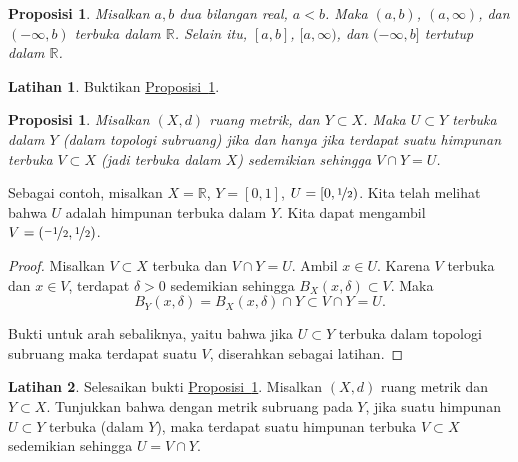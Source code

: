 \documentclass[12pt,openany]{book}
\newcommand{\R}{{\mathbb{R}}}
\theoremstyle{plain}
\newtheorem{prop}[thm]{Proposisi}
\theoremstyle{remark}
\theoremstyle{definition}
\newenvironment{exbox}{%
    \def\FrameCommand{\vrule width 1pt \relax\hspace{10pt}}%
    \MakeFramed{\advance\hsize-\width\FrameRestore}%
}{%
    \endMakeFramed
}
\theoremstyle{exercise}
\newtheorem{exercise}{Latihan}[section]
\theoremstyle{example}
\newcommand{\propref}[1]{\hyperref[#1]{Proposisi~\ref*{#1}}}
\begin{document}
\begin{prop} \label{prop:topology:intervals:openclosed}
Misalkan $a,b$ dua bilangan real, $a < b$. Maka $(a,b)$, $(a,\infty)$,
dan $(-\infty,b)$ terbuka dalam $\R$.
Selain itu, $[a,b]$, $[a,\infty)$,
dan $(-\infty,b]$ tertutup dalam $\R$.
\end{prop}


\begin{exbox}
\begin{exercise}
Buktikan \propref{prop:topology:intervals:openclosed}.
\end{exercise}
\end{exbox}

\begin{prop} \label{prop:topology:subspaceopen}
Misalkan $(X,d)$ ruang metrik, dan $Y \subset X$. Maka $U \subset Y$
terbuka dalam $Y$ (dalam topologi subruang) jika dan hanya jika
terdapat suatu himpunan terbuka $V \subset X$ (jadi terbuka dalam $X$) sedemikian sehingga
$V \cap Y = U$.
\end{prop}

Sebagai contoh, misalkan $X = \R$, $Y=[0,1]$, $U = [0,\nicefrac{1}{2})$.
Kita telah melihat bahwa $U$ adalah himpunan terbuka dalam $Y$.
Kita dapat mengambil $V = (\nicefrac{-1}{2},\nicefrac{1}{2})$.

\begin{proof}
Misalkan $V \subset X$ terbuka dan
$V \cap Y = U$.
Ambil $x \in U$.
Karena $V$ terbuka dan $x \in V$, terdapat
$\delta > 0$ sedemikian sehingga $B_X(x,\delta) \subset V$.
Maka
\begin{equation*}
B_Y(x,\delta) = B_X(x,\delta) \cap Y \subset V \cap Y = U .
\end{equation*}

Bukti untuk arah sebaliknya, yaitu bahwa jika $U \subset Y$
terbuka dalam topologi subruang maka terdapat suatu $V$, diserahkan sebagai
latihan.
\end{proof}

\begin{exbox}
\begin{exercise}
Selesaikan bukti \propref{prop:topology:subspaceopen}.
Misalkan $(X,d)$ ruang metrik dan $Y \subset X$. Tunjukkan bahwa
dengan metrik subruang pada $Y$, jika suatu himpunan $U \subset Y$
terbuka (dalam $Y$), maka terdapat suatu himpunan terbuka $V \subset X$ sedemikian
sehingga $U = V \cap Y$.
\end{exercise}
\end{exbox}
\end{document}
